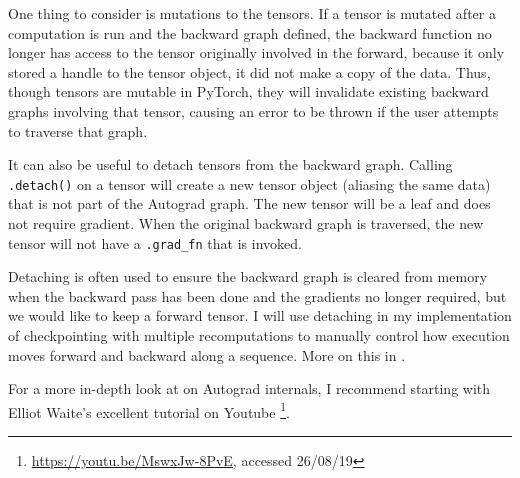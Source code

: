 One thing to consider is mutations to the tensors.
If a tensor is mutated after a computation is run and the backward graph defined, the backward function no longer has access to the tensor originally involved in the forward, because it only stored a handle to the tensor object, it did not make a copy of the data. 
Thus, though tensors are mutable in PyTorch, they will invalidate existing backward graphs involving that tensor, causing an error to be thrown if the user attempts to traverse that graph.

It can also be useful to detach tensors from the backward graph. Calling \texttt{.detach()} on a tensor will create a new tensor object (aliasing the same data) that is not part of the Autograd graph.
The new tensor will be a leaf and does not require gradient.
When the original backward graph is traversed, the new tensor will not have a \texttt{.grad\_fn} that is invoked.

Detaching is often used to ensure the backward graph is cleared from memory when the backward pass has been done and the gradients no longer required, but we would like to keep a forward tensor.
I will use detaching in my implementation of checkpointing with multiple recomputations to manually control how execution moves forward and backward along a sequence.
More on this in \todo{[sec]}.

For a more in-depth look at on Autograd internals, I recommend starting with Elliot Waite's excellent tutorial on Youtube \footnote{\url{https://youtu.be/MswxJw-8PvE}, accessed 26/08/19}.

